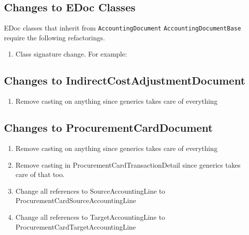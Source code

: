 \documentclass[12pt,notitlepage]{article}
\begin{document}
  \subsection{Changes to EDoc Classes}
  EDoc classes that inherit from \verb|AccountingDocument| \verb|AccountingDocumentBase| require the following refactorings.
  \begin{enumerate}
    \item Class signature change. For example:
  \end{enumerate}
  \subsection{Changes to IndirectCostAdjustmentDocument}
    \begin{enumerate}
    \item Remove casting on anything since generics takes care of everything
    \end{enumerate}
    
  \subsection{Changes to ProcurementCardDocument}
    \begin{enumerate}
      \item Remove casting on anything since generics takes care of everything
      \item Remove casting in ProcurementCardTransactionDetail since generics takes care of that too.
      \item Change all references to SourceAccountingLine to ProcurementCardSourceAccountingLine
      \item Change all references to TargetAccountingLine to ProcurementCardTargetAccountingLine
   \end{enumerate}
\end{document}
